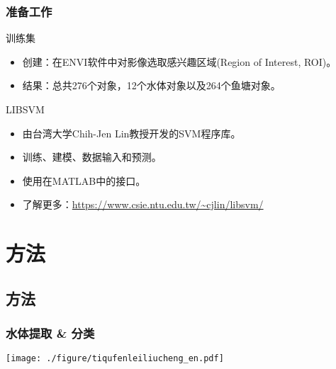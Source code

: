 \documentclass[10pt]{beamer}
\newcommand{\slideheight}{6.7cm}
\begin{document}
\begin{frame}
\frametitle{准备工作}
\begin{block}{训练集}
	\begin{itemize}
	\item 创建：在ENVI软件中对影像选取感兴趣区域(Region of Interest, ROI)。\\
	\item 结果：总共276个对象，12个水体对象以及264个鱼塘对象。
	\end{itemize}
\end{block}
\begin{block}{LIBSVM}
	\begin{itemize}
		\item 由台湾大学Chih-Jen Lin教授开发的SVM程序库。
		\item 训练、建模、数据输入和预测。
		\item 使用在MATLAB中的接口。
		\item 了解更多：\url{https://www.csie.ntu.edu.tw/~cjlin/libsvm/}
	\end{itemize}
\end{block}
\end{frame}

\section{方法}
\subsection{方法}


\begin{frame}
 \frametitle{水体提取 \& 分类}
 \centering
 \texttt{[image: ./figure/tiqufenleiliucheng\_en.pdf]}
\end{frame}

\newcommand{\masterpicheight}{5cm}
\end{document}
